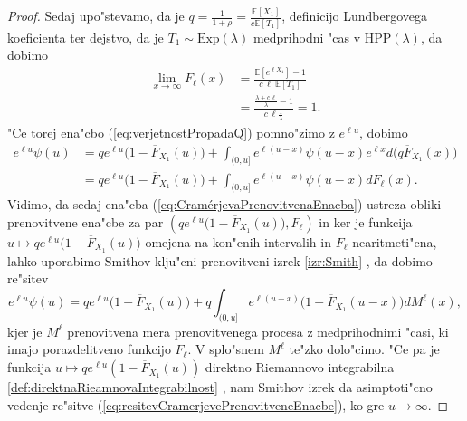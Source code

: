 \documentclass[12pt, a4paper, reqno]{amsart}
\theoremstyle{definition}
\theoremstyle{plain}
\newcommand{\E}{\mathbb{E}}
\newcommand{\1}{\mathds{1}}
\newcommand*{\refPriloga}[1]{%
  \begingroup
    \hypersetup{
      linkcolor=red,
      linkbordercolor=red,
    }%
    \ref{#1}%
  \endgroup
}
\begin{document}
\begin{proof}
                Sedaj upo"stevamo, da je $q = \frac{1}{1 + \rho} = \frac{\E\left[X_1\right]}{c\E\left[T_1\right]}$, 
                definicijo Lundbergovega koeficienta ter dejstvo, da je $T_1\sim\text{Exp}(\lambda)$ medprihodni "cas v $\text{HPP}(\lambda)$, da dobimo
                \begin{align*}
                    \lim_{x\to\infty}F_\ell(x)  &= \frac{\E\left[e^{\ell X_1}\right] - 1}{c\,\ell\ \E\left[T_1\right]}\\
                                                &= \frac{\frac{\lambda + c\,\ell}{\lambda} - 1}{c\,\ell \frac{1}{\lambda}} = 1.
                \end{align*}
                "Ce torej ena"cbo (\ref{eq:verjetnostPropadaQ}) pomno"zimo z $e^{\ell u}$, dobimo
                \begin{align}
                    e^{\ell u}\psi(u)   &= qe^{\ell u}\bigl(1 - \overline{F}_{X_1}(u)\bigr) + \int_{(0, u]}e^{\ell (u - x)}\psi(u - x)e^{\ell x}d\bigl(q\overline{F}_{X_1}(x)\bigr) \nonumber \\
                                        &= qe^{\ell u}\bigl(1 - \overline{F}_{X_1}(u)\bigr) + \int_{(0, u]}e^{\ell (u - x)}\psi(u - x)dF_\ell(x). \label{eq:CramérjevaPrenovitvenaEnacba}
                \end{align}
                Vidimo, da sedaj ena"cba (\ref{eq:CramérjevaPrenovitvenaEnacba}) ustreza obliki prenovitvene ena"cbe za par \newline $\left(qe^{\ell u}\bigl(1 - \overline{F}_{X_1}(u)\bigr), F_\ell\right)$
                in ker je funkcija $u\mapsto qe^{\ell u}\bigl(1 - \overline{F}_{X_1}(u)\bigr)$ omejena na kon"cnih 
                intervalih in $F_\ell$ nearitmeti"cna, lahko uporabimo Smithov klju"cni prenovitveni izrek \refPriloga{izr:Smith}, da dobimo
                re"sitev
                \begin{equation}
                    e^{\ell u}\psi(u) =qe^{\ell u}\bigl(1 - \overline{F}_{X_1}(u)\bigr) +  q\int_{(0, u]}e^{\ell(u - x)}\bigl(1 - \overline{F}_{X_1}(u - x)\bigr)dM^{\ell}(x),
                    \label{eq:resitevCramerjevePrenovitveneEnacbe}
                \end{equation}
                kjer je $M^{\ell}$ prenovitvena mera prenovitvenega procesa z medprihodnimi "casi, 
                ki imajo porazdelitveno funkcijo $F_\ell$. V splo"snem $M^{\ell}$ te"zko dolo"cimo. 
                "Ce pa je funkcija $u\mapsto qe^{\ell u}(1 - \overline{F}_{X_1}(u))$ direktno Riemannovo integrabilna
                \refPriloga{def:direktnaRieamnovaIntegrabilnost}, nam 
                Smithov izrek da asimptoti"cno vedenje re"sitve (\ref{eq:resitevCramerjevePrenovitveneEnacbe}),
                ko gre $u\to\infty$.


\end{proof}
\end{document}
